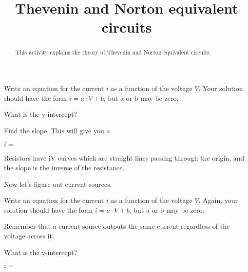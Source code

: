 \documentclass{ximera}
\title{Thevenin and Norton equivalent circuits}
\begin{document}
\begin{abstract}
This activity explains the theory of Thevenin and Norton equivalent circuits.
\end{abstract}

\maketitle



\begin{exercise}
Write an equation for the current $i$ as a function of the voltage $V$.  Your solution should have the form $i = a \cdot V + b$, but a or b may be zero.

\begin{solution}
  \begin{hint}
  \begin{prompt}
    What is the y-intercept? 
  \end{prompt}
  \end{hint}
  \begin{hint}
  Find the slope.  This will give you $a$.
  \end{hint}
  
  $i = $ 
\end{solution}

Resistors have iV curves which are straight lines passing through the origin, and the slope is the inverse of the resistance.
\end{exercise}


Now let's figure out current sources.
\begin{exercise}
Write an equation for the current $i$ as a function of the voltage $V$.  Again, your solution should have the form $i = a \cdot V + b$, but a or b may be zero.

\begin{solution}
  \begin{hint}
    Remember that a current source outputs the same current regardless of the voltage across it.
  \end{hint}
  \begin{hint}
  \begin{prompt}
    What is the y-intercept? 
  \end{prompt}
  \end{hint}
 
  $i = $ 
\end{solution}

\end{exercise}




\end{document}
